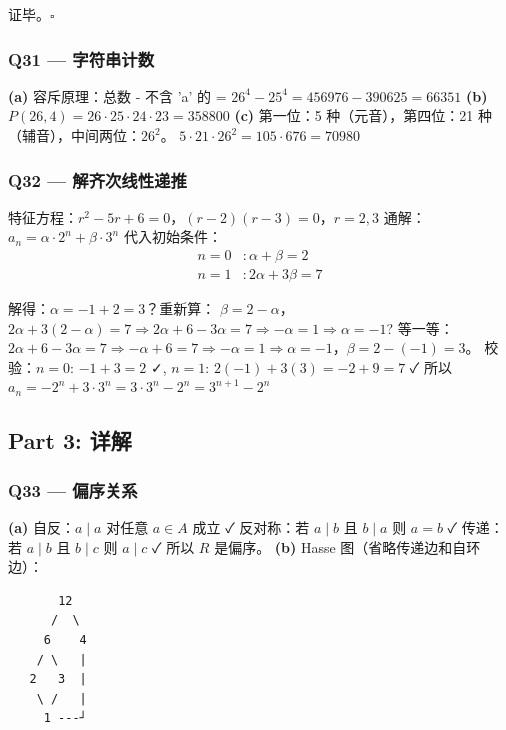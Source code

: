 \documentclass[10pt,a4paper,openany]{ctexbook}
\theoremstyle{definition}
\theoremstyle{remark}
\begin{document}
证毕。$\square$
\vspace{-2pt}

\subsubsection{Q31 — 字符串计数}

\textbf{(a)} 容斥原理：总数 - 不含 'a' 的 = $26^4 - 25^4 = 456976 - 390625 = 66351$
\textbf{(b)} $P(26, 4) = 26 \cdot 25 \cdot 24 \cdot 23 = 358800$
\textbf{(c)} 第一位：5 种（元音），第四位：21 种（辅音），中间两位：$26^2$。
$5 \cdot 21 \cdot 26^2 = 105 \cdot 676 = 70980$
\vspace{-2pt}

\subsubsection{Q32 — 解齐次线性递推}

特征方程：$r^2 - 5r + 6 = 0$，$(r-2)(r-3) = 0$，$r = 2, 3$
通解：$a_n = \alpha \cdot 2^n + \beta \cdot 3^n$
代入初始条件：
\[
\begin{aligned}
n=0&: \alpha + \beta = 2 \\
n=1&: 2\alpha + 3\beta = 7
\end{aligned}
\]

解得：$\alpha = -1 + 2 = 3$？重新算：
$\beta = 2 - \alpha$，$2\alpha + 3(2-\alpha) = 7 \Rightarrow 2\alpha + 6 - 3\alpha = 7 \Rightarrow -\alpha = 1 \Rightarrow \alpha = -1$?
等一等：$2\alpha + 6 - 3\alpha = 7 \Rightarrow -\alpha + 6 = 7 \Rightarrow -\alpha = 1 \Rightarrow \alpha = -1$，$\beta = 2 - (-1) = 3$。
校验：$n=0$: $-1+3=2$ ✓, $n=1$: $2(-1)+3(3)=-2+9=7$ ✓
所以 $a_n = -2^n + 3 \cdot 3^n = 3 \cdot 3^n - 2^n = 3^{n+1} - 2^n$
\vspace{-2pt}

\subsection{Part 3: 详解}

\subsubsection{Q33 — 偏序关系}

\textbf{(a)} 自反：$a \mid a$ 对任意 $a \in A$ 成立 ✓
反对称：若 $a \mid b$ 且 $b \mid a$ 则 $a = b$ ✓
传递：若 $a \mid b$ 且 $b \mid c$ 则 $a \mid c$ ✓
所以 $R$ 是偏序。
\textbf{(b)} Hasse 图（省略传递边和自环边）：
{\footnotesize\begin{verbatim}
       12
      /  \
     6    4
    / \   |
   2   3  |
    \ /   |
     1 ---┘
\end{verbatim}}
\end{document}
